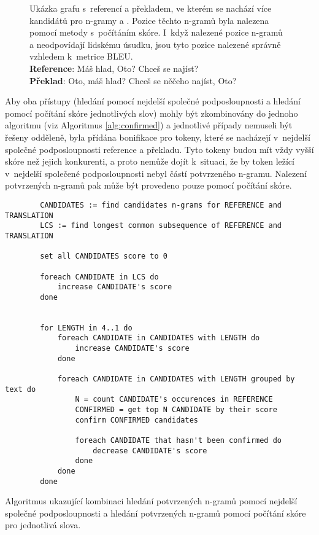 \begin{figure}[h!]

	\caption{
		Ukázka grafu s~referencí a překladem, ve kterém se nachází více kandidátů pro \mbox{n-gramy}  a \uv{,}.
		Pozice těchto \mbox{n-gramů} byla nalezena pomocí metody s~počítáním skóre.
		I~když nalezené pozice \mbox{n-gramů}  a \uv{,} neodpovídají lidskému úsudku,
		jsou tyto pozice nalezené správně vzhledem k~metrice BLEU. \\
		\textbf{Reference}: Máš hlad, Oto? Chceš se najíst?\\
		\textbf{Překlad}: Oto, máš hlad? Chceš se něčeho najíst, Oto?
	}
	\label{img:graph-6}
\end{figure}
  
Aby oba přístupy (hledání pomocí nejdelší společné podposloupnosti a hledání pomocí počítání skóre jednotlivých slov) mohly být zkombinovány do jednoho algoritmu (viz Algoritmus \ref{alg:confirmed}) a
  jednotlivé případy nemuseli být řešeny odděleně,
  byla přídána bonifikace pro tokeny,
  které se nacházejí v~nejdelší společné podposloupnosti reference a překladu.
Tyto tokeny budou mít vždy vyšší skóre než jejich konkurenti,
  a proto nemůže dojít k~situaci,
  že by token ležící v~nejdelší společené podposloupnosti nebyl částí potvrzeného \mbox{n-gramu}.
Nalezení potvrzených \mbox{n-gramů} pak může být provedeno pouze pomocí počítání skóre.


\begin{algorithm}
	\begin{verbatim}
		CANDIDATES := find candidates n-grams for REFERENCE and TRANSLATION
		LCS := find longest common subsequence of REFERENCE and TRANSLATION

		set all CANDIDATES score to 0

		foreach CANDIDATE in LCS do
		    increase CANDIDATE's score
		done


		for LENGTH in 4..1 do
		    foreach CANDIDATE in CANDIDATES with LENGTH do
		        increase CANDIDATE's score
		    done

		    foreach CANDIDATE in CANDIDATES with LENGTH grouped by text do
		        N = count CANDIDATE's occurences in REFERENCE
		        CONFIRMED = get top N CANDIDATE by their score
		        confirm CONFIRMED candidates
		        
		        foreach CANDIDATE that hasn't been confirmed do
		            decrease CANDIDATE's score
		        done
		    done
		done
	\end{verbatim}
	\caption{
		Algoritmus ukazující kombinaci hledání potvrzených n-gramů pomocí nejdelší společné podposloupnosti
		a hledání potvrzených n-gramů pomocí počítání skóre pro jednotlivá slova.
	}
	\label{alg:confirmed}
\end{algorithm}



